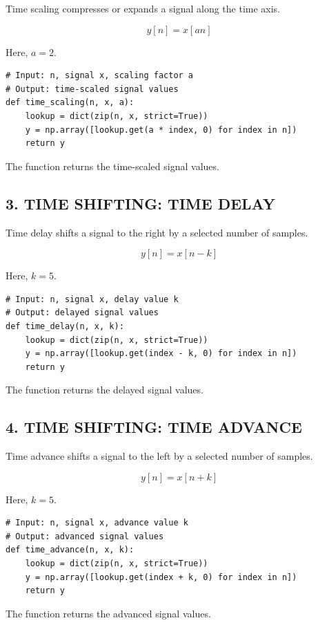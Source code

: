 \documentclass[12pt,a4paper]{article}
\begin{document}
Time scaling compresses or expands a signal along the time axis.

\[
y[n] = x[an]
\]


Here, \(a = 2\).

\begin{lstlisting}[style=pythoncode]
# Input: n, signal x, scaling factor a
# Output: time-scaled signal values
def time_scaling(n, x, a):
    lookup = dict(zip(n, x, strict=True))
    y = np.array([lookup.get(a * index, 0) for index in n])
    return y
\end{lstlisting}

The function returns the time-scaled signal values.

\subsection*{3. TIME SHIFTING: TIME DELAY}

Time delay shifts a signal to the right by a selected number of samples.

\[
y[n] = x[n - k]
\]


Here, \(k = 5\).

\begin{lstlisting}[style=pythoncode]
# Input: n, signal x, delay value k
# Output: delayed signal values
def time_delay(n, x, k):
    lookup = dict(zip(n, x, strict=True))
    y = np.array([lookup.get(index - k, 0) for index in n])
    return y
\end{lstlisting}

The function returns the delayed signal values.

\subsection*{4. TIME SHIFTING: TIME ADVANCE}

Time advance shifts a signal to the left by a selected number of samples.

\[
y[n] = x[n + k]
\]


Here, \(k = 5\).

\begin{lstlisting}[style=pythoncode]
# Input: n, signal x, advance value k
# Output: advanced signal values
def time_advance(n, x, k):
    lookup = dict(zip(n, x, strict=True))
    y = np.array([lookup.get(index + k, 0) for index in n])
    return y
\end{lstlisting}

The function returns the advanced signal values.
\end{document}
